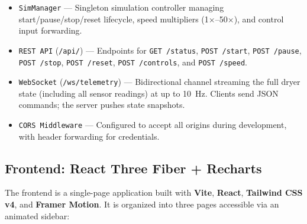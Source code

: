 ﻿\documentclass[12pt, a4paper]{report}
\begin{document}
\begin{itemize}
    \item \texttt{SimManager} --- Singleton simulation controller managing start/pause/stop/reset lifecycle, speed multipliers (1$\times$--50$\times$), and control input forwarding.
    \item \texttt{REST API} (\texttt{/api/}) --- Endpoints for \texttt{GET /status}, \texttt{POST /start}, \texttt{POST /pause}, \texttt{POST /stop}, \texttt{POST /reset}, \texttt{POST /controls}, and \texttt{POST /speed}.
    \item \texttt{WebSocket} (\texttt{/ws/telemetry}) --- Bidirectional channel streaming the full dryer state (including all sensor readings) at up to 10~Hz. Clients send JSON commands; the server pushes state snapshots.
    \item \texttt{CORS Middleware} --- Configured to accept all origins during development, with header forwarding for credentials.
\end{itemize}

\subsection{Frontend: React Three Fiber + Recharts}
The frontend is a single-page application built with \textbf{Vite}, \textbf{React}, \textbf{Tailwind CSS v4}, and \textbf{Framer Motion}. It is organized into three pages accessible via an animated sidebar:
\end{document}
